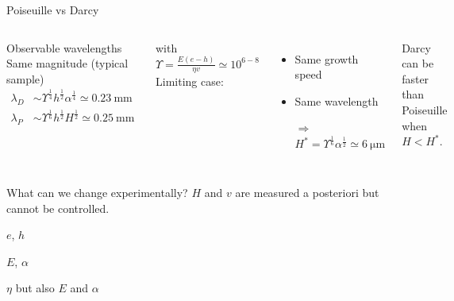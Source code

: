 
\begin{frame}{Poiseuille vs Darcy}
\begin{columns}
\begin{block}{Observable wavelengths}
Same magnitude (typical sample)
\begin{align*}
\lambda_D &\sim \Upsilon^\frac{1}{4} h^\frac{1}{2} \alpha^\frac{1}{4}\simeq \SI{0.23}{\milli\metre}\\
\lambda_P &\sim \Upsilon^\frac{1}{6} h^\frac{1}{2} H^\frac{1}{2}\simeq \SI{0.25}{\milli\metre}
\end{align*}
\end{block}
with $\Upsilon = \frac{E(e-h)}{\eta v}\simeq 10^{6-8}$
Limiting case:
\begin{itemize}
\item Same growth speed
\item Same wavelength
\item[$\Rightarrow$] $H^* = \Upsilon^\frac{1}{6} \alpha^\frac{1}{2}\simeq \SI{6}{\micro\metre}$
\end{itemize}
Darcy can be faster than Poiseuille when $H<H^*$.
\end{columns}
\begin{block}{What can we change experimentally?}
$H$ and $v$ are measured a posteriori but cannot be controlled.
\begin{description}[leftmargin=8em]
\item[Geometry] $e$, $h$
\item[Composition] $E$, $\alpha$
\item[Solvent] $\eta$ \alert{but also $E$ and $\alpha$}
\end{description}
\end{block}
\end{frame}


